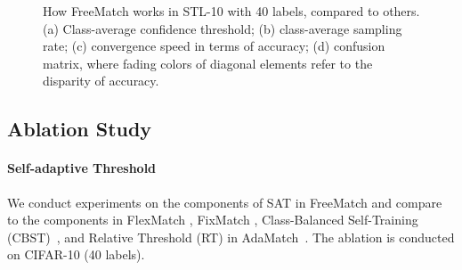 \documentclass{article} \usepackage{iclr2023_conference,times}
\theoremstyle{plain}
\theoremstyle{definition}
\theoremstyle{remark}
\newcommand{\ourmethod}{FreeMatch\xspace}
\begin{document}
\begin{figure}[t!]
\hfill
{}
\hfill
{}
\hfill
{}
\hfill
{}
\hfill
\vspace{-.1in}
\caption{How FreeMatch works in STL-10 with 40 labels, compared to others. (a) Class-average confidence threshold; (b) class-average sampling rate; (c) convergence speed in terms of accuracy; (d) confusion matrix, where fading colors of diagonal elements refer to the disparity of accuracy.}
\label{fig:stl10-threshold-sample}
\vspace{-.2in}
\end{figure}







\subsection{Ablation Study}

\paragraph{Self-adaptive Threshold}












We conduct experiments on the components of SAT in \ourmethod and compare to the components in FlexMatch \citep{zhang2021flexmatch}, FixMatch \citep{sohn2020fixmatch}, Class-Balanced Self-Training (CBST)~\citep{zou2018unsupervised}, and Relative Threshold (RT) in AdaMatch~\citep{berthelot2021adamatch}. The ablation is conducted on CIFAR-10 (40 labels).
\end{document}

